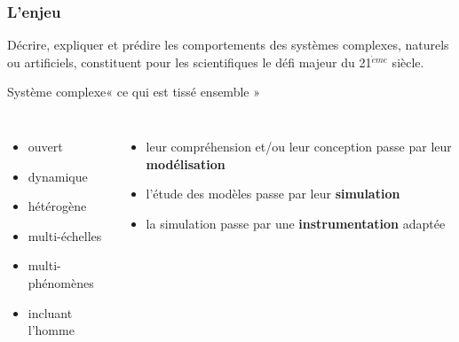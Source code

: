 \documentclass{beamer}
\begin{document}
\begin{frame}
\frametitle{L'enjeu}
\label{letemps1}
\begin{block}{}
Décrire, expliquer et prédire les comportements des systèmes complexes,
naturels ou artificiels, constituent pour les scientifiques le défi majeur
du 21$^{\grave eme}$ siècle.
\end{block}

\pause

\begin{block}{Système complexe\hfill {\footnotesize « ce qui est tissé ensemble »}}

\begin{columns}[T]
\column{3.75cm}
\begin{itemize}
\item ouvert
\item dynamique
\item hétérogène
\item multi-échelles
\item multi-phénomènes
\item incluant l'homme
\end{itemize}
\pause
\column{6.5cm}
\begin{itemize}
\item leur compréhension et/ou leur conception passe par leur \alert{\bf modélisation}
\pause
\item l'étude des modèles passe par leur \alert{\bf simu\-lation}
\pause
\item la simulation passe par une \alert{\bf instrumen\-tation} adaptée
\end{itemize}
\end{columns}
\end{block}
	


\end{frame}
\end{document}
